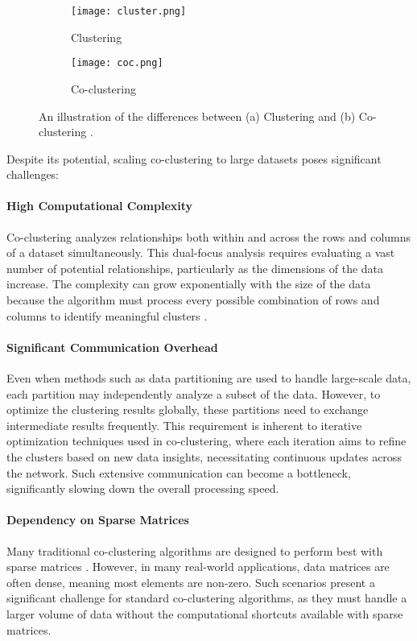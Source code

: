 \begin{figure}[htbp]
    \centering
    \begin{subfigure}[b]{0.22\textwidth}
        \texttt{[image: cluster.png]}
        \caption{Clustering}
        \label{fig:cluster}
    \end{subfigure}
    \hfill
    \begin{subfigure}[b]{0.22\textwidth}
        \texttt{[image: coc.png]}
        \caption{Co-clustering}
        \label{fig:cocluster}
    \end{subfigure}
    \caption{An illustration of the differences between (a) Clustering and (b) Co-clustering \cite{yan2017CoclusteringMultidimensionalBig}.}
    \label{fig:cocomparison}
\end{figure}

Despite its potential, scaling co-clustering to large datasets poses significant challenges:

\paragraph{High Computational Complexity}Co-clustering analyzes relationships both within and across the rows and columns of a dataset simultaneously. This dual-focus analysis requires evaluating a vast number of potential relationships, particularly as the dimensions of the data increase. The complexity can grow exponentially with the size of the data because the algorithm must process every possible combination of rows and columns to identify meaningful clusters \cite{hansen2011NonparametricCoclusteringLarge}.
\paragraph{Significant Communication Overhead}Even when methods such as data partitioning are used to handle large-scale data, each partition may independently analyze a subset of the data. However, to optimize the clustering results globally, these partitions need to exchange intermediate results frequently. This requirement is inherent to iterative optimization techniques used in co-clustering, where each iteration aims to refine the clusters based on new data insights, necessitating continuous updates across the network. Such extensive communication can become a bottleneck, significantly slowing down the overall processing speed.
\paragraph{Dependency on Sparse Matrices}Many traditional co-clustering algorithms are designed to perform best with sparse matrices \cite{pan2008CRDFastCoclusteringa}. However, in many real-world applications, data matrices are often dense, meaning most elements are non-zero. Such scenarios present a significant challenge for standard co-clustering algorithms, as they must handle a larger volume of data without the computational shortcuts available with sparse matrices.

